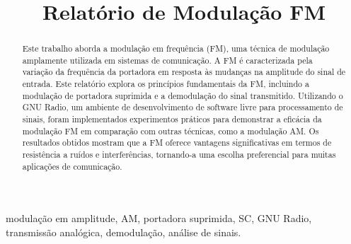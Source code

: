 \documentclass[conference]{IEEEtran}
\begin{document}
\title{Relatório de Modulação FM}

\author{
}

\maketitle

\fancyhead{}

\begin{abstract}
Este trabalho aborda a modulação em frequência (FM), uma técnica de modulação amplamente utilizada em sistemas de comunicação. A FM é caracterizada pela variação da frequência da portadora em resposta às mudanças na amplitude do sinal de entrada. Este relatório explora os princípios fundamentais da FM, incluindo a modulação de portadora suprimida e a demodulação do sinal transmitido. Utilizando o GNU Radio, um ambiente de desenvolvimento de software livre para processamento de sinais, foram implementados experimentos práticos para demonstrar a eficácia da modulação FM em comparação com outras técnicas, como a modulação AM. Os resultados obtidos mostram que a FM oferece vantagens significativas em termos de resistência a ruídos e interferências, tornando-a uma escolha preferencial para muitas aplicações de comunicação.
\end{abstract}

\begin{IEEEkeywords}
modulação em amplitude, AM, portadora suprimida, SC, GNU Radio, transmissão analógica, demodulação, análise de sinais.
\end{IEEEkeywords}



% 





\vspace{12pt}
\end{document}
